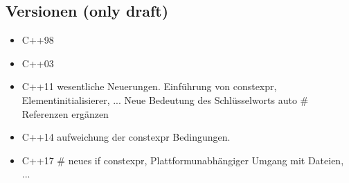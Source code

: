 \documentclass[a4paper]{report}
\begin{document}
\subsection{Versionen (only draft)}
\begin{itemize}
	\item C++98
	\item C++03
	\item C++11
	\subitem wesentliche Neuerungen. Einführung von constexpr, Elementinitialisierer, ... Neue Bedeutung des Schlüsselworts auto \hspace{3cm} \# Referenzen ergänzen %
	\item C++14
	\subitem aufweichung der constexpr Bedingungen.
	\item C++17
	\subitem \# neues if constexpr, Plattformunabhängiger Umgang mit Dateien, ...
\end{itemize}
\end{document}
